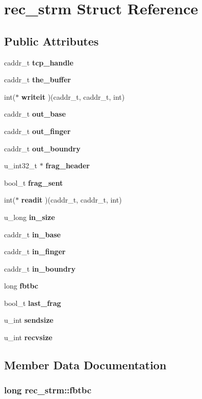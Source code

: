 \section{rec\_\-strm Struct Reference}
\label{structrec__strm}
\subsection*{Public Attributes}
\begin{CompactItemize}
\item 
caddr\_\-t {\bf tcp\_\-handle}
\item 
caddr\_\-t {\bf the\_\-buffer}
\item 
int($\ast$ {\bf writeit} )(caddr\_\-t, caddr\_\-t, int)
\item 
caddr\_\-t {\bf out\_\-base}
\item 
caddr\_\-t {\bf out\_\-finger}
\item 
caddr\_\-t {\bf out\_\-boundry}
\item 
u\_\-int32\_\-t $\ast$ {\bf frag\_\-header}
\item 
bool\_\-t {\bf frag\_\-sent}
\item 
int($\ast$ {\bf readit} )(caddr\_\-t, caddr\_\-t, int)
\item 
u\_\-long {\bf in\_\-size}
\item 
caddr\_\-t {\bf in\_\-base}
\item 
caddr\_\-t {\bf in\_\-finger}
\item 
caddr\_\-t {\bf in\_\-boundry}
\item 
long {\bf fbtbc}
\item 
bool\_\-t {\bf last\_\-frag}
\item 
u\_\-int {\bf sendsize}
\item 
u\_\-int {\bf recvsize}
\end{CompactItemize}


\subsection{Member Data Documentation}
\subsubsection{\setlength{\rightskip}{0pt plus 5cm}long {\bf rec\_\-strm::fbtbc}}\label{structrec__strm_o13}




